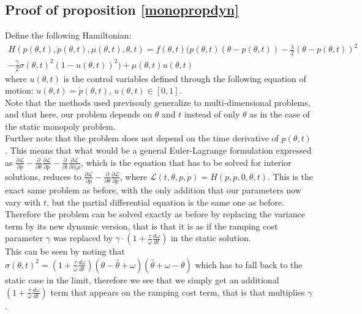 \begin{subappendices}
\section{Proof of proposition \ref{monopropdyn}}\label{monopdyn_proof}

Define the following Hamiltonian: 
\begin{equation}
\begin{split}
H(p(\theta,t),\dot{p}(\theta,t),\mu(\theta,t),\theta,t)= f(\theta,t)\bigg( p(\theta,t)(\theta-p(\theta,t))-\frac{\lambda}{2}(\theta-p(\theta,t))^2\\
-\frac{\gamma}{2}\sigma(\theta,t)^2\left(1-u(\theta,t)\right)^2\bigg)+\mu(\theta,t) u(\theta,t)
\end{split}
\end{equation}
where $u(\theta,t)$ is the control variables defined through the following equation of motion: $u(\theta,t)=\dot{p}(\theta,t)$, $u(\theta,t)\in[0,1]$. \\

Note that the methods used previsouly generalize to multi-dimensional problems, and that here, our problem depends on $\theta$ and $t$ instead of only $\theta$ as in the case of the static monopoly problem. \\

Further note that the problem does not depend on the time derivative of $p(\theta,t)$. This means that what would be a general Euler-Lagrange formulation expressed as $\frac{\partial\mathcal{L}}{\partial p} - \frac{\partial}{\partial \theta}\frac{\partial \mathcal{L}}{\partial \dot{p}} - \frac{\partial}{\partial t}\frac{\partial \mathcal{L}}{\partial \partial_t p}$, which is the equation that has to be solved for interior solutions, reduces to  $\frac{\partial\mathcal{L}}{\partial p} - \frac{\partial}{\partial \theta}\frac{\partial \mathcal{L}}{\partial \dot{p}}$, where  $\mathcal{L}(t,\theta,p,\dot{p}) = H(p,\dot{p},0,\theta,t)$. This is the exact same problem as before, with the only addition that our parameters now vary with $t$, but the partial differential equation is the same one as before. \\

Therefore the problem can be solved exactly as before by replacing the variance term by its new dynamic version, that is that it is as if the ramping cost parameter $\gamma$ was replaced by $\gamma \cdot \left( 1+ \frac{\tau}{\omega}\frac{d\omega}{dt}\right)$ in the static solution.\\

This can be seen by noting that $\sigma(\theta,t)^2 = \left(1+\frac{\tau}{\omega}\frac{d\omega}{dt}\right)(\theta-\hat{\theta}+\omega)(\hat{\theta}+\omega-\theta)$ which has to fall back to the static case in the limit, therefore we see that we simply get an additional $\left(1+\frac{\tau}{\omega}\frac{d\omega}{dt}\right)$ term that appears on the ramping cost term, that is that multiplies $\gamma$.


\end{subappendices}

